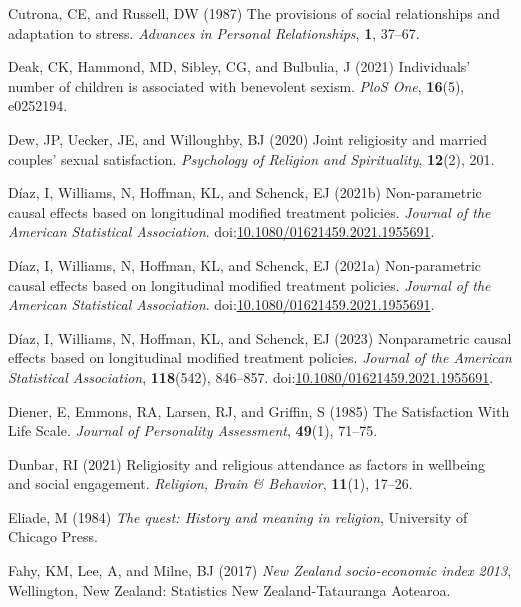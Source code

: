 \documentclass[
  single column]{article}
\newlength{\cslhangindent}
\newenvironment{CSLReferences}[2] %
 {\begin{list}{}{%
  \setlength{\itemindent}{0pt}
  \setlength{\leftmargin}{0pt}
  \setlength{\parsep}{0pt}
  \ifodd #1
   \setlength{\leftmargin}{\cslhangindent}
   \setlength{\itemindent}{-1\cslhangindent}
  \fi
  \setlength{\itemsep}{#2\baselineskip}}}
 {\end{list}}
\begin{document}
\begin{CSLReferences}{1}{0}
Cutrona, CE, and Russell, DW (1987) The provisions of social
relationships and adaptation to stress. \emph{Advances in Personal
Relationships}, \textbf{1}, 37--67.

Deak, CK, Hammond, MD, Sibley, CG, and Bulbulia, J (2021) Individuals'
number of children is associated with benevolent sexism. \emph{PloS
One}, \textbf{16}(5), e0252194.

Dew, JP, Uecker, JE, and Willoughby, BJ (2020) Joint religiosity and
married couples' sexual satisfaction. \emph{Psychology of Religion and
Spirituality}, \textbf{12}(2), 201.

Díaz, I, Williams, N, Hoffman, KL, and Schenck, EJ (2021b)
Non-parametric causal effects based on longitudinal modified treatment
policies. \emph{Journal of the American Statistical Association}.
doi:\href{https://doi.org/10.1080/01621459.2021.1955691}{10.1080/01621459.2021.1955691}.

Díaz, I, Williams, N, Hoffman, KL, and Schenck, EJ (2021a)
Non-parametric causal effects based on longitudinal modified treatment
policies. \emph{Journal of the American Statistical Association}.
doi:\href{https://doi.org/10.1080/01621459.2021.1955691}{10.1080/01621459.2021.1955691}.

Díaz, I, Williams, N, Hoffman, KL, and Schenck, EJ (2023) Nonparametric
causal effects based on longitudinal modified treatment policies.
\emph{Journal of the American Statistical Association},
\textbf{118}(542), 846--857.
doi:\href{https://doi.org/10.1080/01621459.2021.1955691}{10.1080/01621459.2021.1955691}.

Diener, E, Emmons, RA, Larsen, RJ, and Griffin, S (1985) The
Satisfaction With Life Scale. \emph{Journal of Personality Assessment},
\textbf{49}(1), 71--75.

Dunbar, RI (2021) Religiosity and religious attendance as factors in
wellbeing and social engagement. \emph{Religion, Brain \& Behavior},
\textbf{11}(1), 17--26.

Eliade, M (1984) \emph{The quest: History and meaning in religion},
University of Chicago Press.

Fahy, KM, Lee, A, and Milne, BJ (2017) \emph{{N}ew {Z}ealand
socio-economic index 2013}, Wellington, New Zealand: Statistics New
Zealand-Tatauranga Aotearoa.


\end{CSLReferences}
\end{document}
